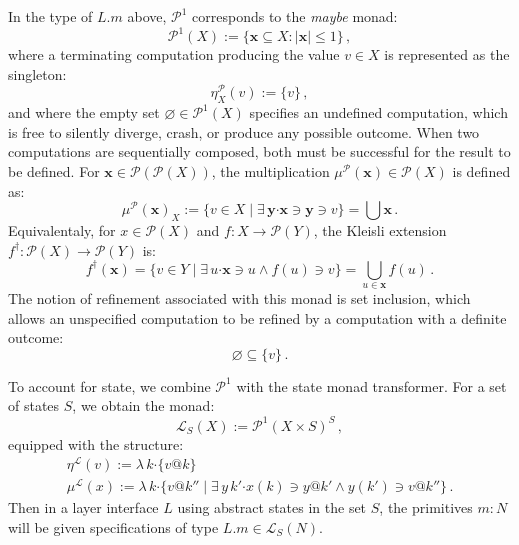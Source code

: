 \documentclass[11pt,oneside,draft]{book}
\theoremstyle{definition}
\newcommand{\bdot}{\boldsymbol{\cdot}}
\begin{document}
In the type of $L.m$ above,
$\mathcal{P}^1$ corresponds to the \emph{maybe} monad:
\[
  \mathcal{P}^1(X) := \{ \mathbf{x} \subseteq X : |\mathbf{x}| \le 1 \} \,,
\]
where a terminating computation producing
the value $v \in X$ is represented as the singleton:
\[
  \eta^\mathcal{P}_X(v) := \{ v \} \,,
\]
and where the empty set $\varnothing \in \mathcal{P}^1(X)$
specifies an undefined computation,
which is free to silently diverge, crash, or
produce any possible outcome.
When two computations are sequentially composed,
both must be successful for the result to be defined.
For $\mathbf{x} \in \mathcal{P}(\mathcal{P}(X))$,
the multiplication $\mu^\mathcal{P}(\mathbf{x}) \in \mathcal{P}(X)$
is defined as:
\[
  \mu^\mathcal{P}(\mathbf{x})_X :=
    \{ v \in X \mid
       \exists \, \mathbf{y} \bdot \mathbf{x} \ni \mathbf{y} \ni v \} =
    \bigcup \mathbf{x}
  \,.
\]
Equivalentaly,
for $x \in \mathcal{P}(X)$ and $f : X \rightarrow \mathcal{P}(Y)$,
the Kleisli extension
$f^\dagger : \mathcal{P}(X) \rightarrow \mathcal{P}(Y)$ is:
\[
  f^\dagger(\mathbf{x})
    = \{ v \in Y \mid \exists \, u \bdot \mathbf{x} \ni u \wedge f(u) \ni v \}
    = \bigcup_{u \in \mathbf{x}} f(u)
  \,.
\]
The notion of refinement associated with this monad is set inclusion,
which allows an unspecified computation to be refined by
a computation with a definite outcome:
\[
  \varnothing \subseteq \{ v \} \,.
\]

To account for state,
we combine $\mathcal{P}^1$ with the state monad transformer.
For a set of states $S$,
we obtain the monad:
\[
  \mathcal{L}_S(X) :=
    \mathcal{P}^1(X \times S)^S \,,
\]
equipped with the structure:
\begin{gather*}
  \eta^\mathcal{L}(v) :=
    \lambda \, k \bdot \{ v@k \} \\
  \mu^\mathcal{L}(x) :=
    \lambda \, k \bdot \{ v@k'' \mid
      \exists \, y \, k' \bdot x(k) \ni y@k' \wedge y(k') \ni v@k'' \}
  \,.
\end{gather*}
Then in a layer interface $L$
using abstract states in the set $S$,
the primitives $m \mathbin: N$
will be given specifications
of type $L.m \in \mathcal{L}_S(N)$.
\end{document}
